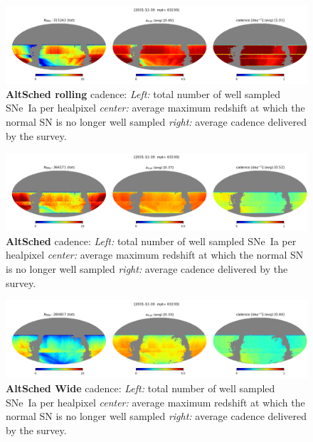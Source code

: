 

\begin{figure}[h!]
  \begin{center}
    \includegraphics[width=\linewidth]{Figures/altsched_rolling_good_weather_64_maps.png}
    \caption{{\bf AltSched rolling} cadence: {\em Left:} total number
      of well sampled SNe~Ia per healpixel {\em center:} average
      maximum redshift at which the normal SN is no longer well
      sampled {\em right:} average cadence delivered by the survey.}
    \label{fig:altsched_rolling_good_weather}
  \end{center}
\end{figure}


\begin{figure}[h!]
  \begin{center}
    \includegraphics[width=\linewidth]{Figures/altsched_good_weather_64_maps.png}
    \caption{{\bf AltSched} cadence: {\em Left:} total number of well
      sampled SNe~Ia per healpixel {\em center:} average maximum
      redshift at which the normal SN is no longer well sampled {\em
        right:} average cadence delivered by the survey.}
    \label{fig:altsched_good_weather}
  \end{center}
\end{figure}

\begin{figure}[h!]
  \begin{center}
    \includegraphics[width=\linewidth]{Figures/altsched_18__90_40_64_maps.png}
    \caption{{\bf AltSched Wide} cadence: {\em Left:} total number of well
      sampled SNe~Ia per healpixel {\em center:} average maximum
      redshift at which the normal SN is no longer well sampled {\em
        right:} average cadence delivered by the survey.}
  \end{center}
  \label{fig:altsched_wide}
\end{figure}

